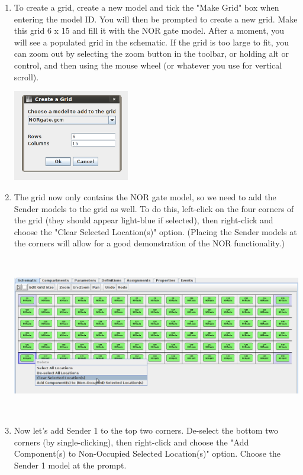 \documentclass[titlepage,11pt]{article}
\begin{document}
\begin{enumerate}

\item To create a grid, create a new model and tick the "Make Grid" box when entering the model ID.  You will then be prompted to create a new grid.  Make this grid 6 x 15 and fill it with the NOR gate model.  After a moment, you will see a populated grid in the schematic.  If the grid is too large to fit, you can zoom out by selecting the zoom button in the toolbar, or holding alt or control, and then using the mouse wheel (or whatever you use for vertical scroll).  

\includegraphics[height=40mm]{screenshots/create_grid}

\item The grid now only contains the NOR gate model, so we need to add the Sender models to the grid as well.  To do this, left-click on the four corners of the grid (they should appear light-blue if selected), then right-click and choose the "Clear Selected Location(s)" option.  (Placing the Sender models at the corners will allow for a good demonstration of the NOR functionality.)

\includegraphics[height=70mm]{screenshots/clear_locations}

\item Now let's add Sender 1 to the top two corners.  De-select the bottom two corners (by single-clicking), then right-click and choose the "Add Component(s) to Non-Occupied Selected Location(s)" option.  Choose the Sender 1 model at the prompt.


\end{enumerate}
\end{document}
